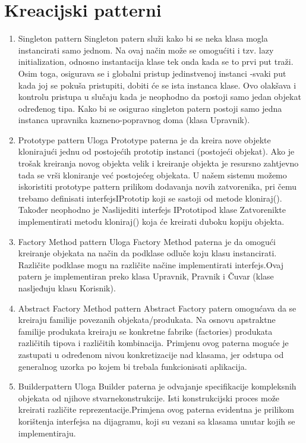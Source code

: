 \documentclass[12pt, a4paper]{report}
\theoremstyle{definition}
\begin{document}
\section *{Kreacijski patterni}
\begin{enumerate}

  \item  \large Singleton pattern \newline
  \normalsize
  Singleton patern služi kako bi se neka klasa mogla instancirati samo jednom. Na ovaj način može se omogućiti i tzv. lazy initialization, odnosno instantacija klase tek onda kada se to prvi put traži. Osim toga, osigurava se i globalni pristup jedinstvenoj instanci -svaki put kada joj se pokuša pristupiti, dobiti će se ista instanca klase. Ovo olakšava i kontrolu pristupa u slučaju kada je neophodno da postoji samo jedan objekat određenog tipa. Kako bi se osigurao singleton patern postoji samo jedna instanca upravnika kazneno-popravnog doma (klasa Upravnik).
  \item \large Prototype pattern \newline
  \normalsize
  Uloga Prototype paterna je da kreira nove objekte klonirajući jednu od postojećih prototip instanci (postojeći objekat). Ako je trošak kreiranja novog objekta velik i kreiranje objekta je resursno zahtjevno tada se vrši kloniranje već postojećeg objekata. U našem sistemu možemo iskoristiti prototype pattern prilikom dodavanja novih zatvorenika, pri čemu trebamo definisati interfejsIPrototip koji  se  sastoji  od  metode kloniraj(). Također neophodno je Naslijediti interfejs IPrototipod  klase Zatvorenikte  implementirati  metodu kloniraj() koja će kreirati duboku kopiju objekta.
   \item \large Factory Method pattern \newline
  \normalsize
  Uloga Factory Method paterna je da omogući kreiranje objekata na način da podklase odluče koju klasu instancirati. Različite podklase mogu na različite načine implementirati interfejs.Ovaj patern je implementiran preko klasa Upravnik, Pravnik i Čuvar (klase nasljeđuju klasu Korisnik).
    \item \large Abstract Factory Method pattern \newline
  \normalsize
  Abstract Factory patern omogućava da se kreiraju familije povezanih objekata/produkata. Na osnovu  apstraktne  familije produkata  kreiraju  se  konkretne  fabrike  (factories)  produkata različitih  tipova  i  različitih  kombinacija. Primjenu ovog  paterna  moguće je  zastupati  u određenom nivou konkretizacije nad klasama, jer odstupa od generalnog uzorka po kojem bi trebala funkcionisati aplikacija.
     \item \large Builderpattern \newline
  \normalsize
  Uloga  Builder  paterna  je  odvajanje  specifikacije  kompleksnih  objekata  od  njihove  stvarnekonstrukcije. Isti konstrukcijski proces može kreirati različite reprezentacije.Primjena  ovog paterna evidentna je prilikom korištenja  interfejsa  na  dijagramu,  koji  su  vezani  sa  klasama unutar kojih se implementiraju.
  \end{enumerate}
\end{document}
